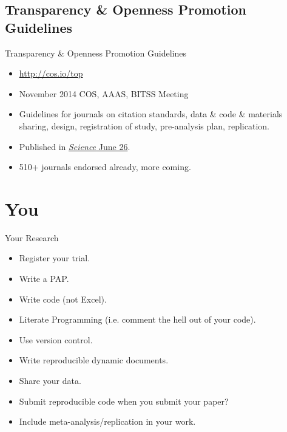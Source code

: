 \documentclass{beamer}
\begin{document}
\subsection{Transparency \& Openness Promotion Guidelines}
\begin{frame}{Transparency \& Openness Promotion Guidelines}
\begin{itemize}
\item \url{http://cos.io/top}
\item November 2014 COS, AAAS, BITSS Meeting

\item Guidelines for journals on citation standards, data \& code \& materials sharing, design, registration of study, pre-analysis plan, replication.

\item Published in \href{http://www.sciencemag.org/content/348/6242/1422.full}{\textit{Science} June 26}. 

\item 510+ journals endorsed already, more coming.
\end{itemize} 
\end{frame}
\section{You}
\begin{frame}{Your Research}
\begin{itemize}
\item Register your trial.
\item Write a PAP.
\item Write code (not Excel).
\item Literate Programming (i.e. comment the hell out of your code).
\item Use version control.
\item Write reproducible dynamic documents.
\item Share your data.
\item Submit reproducible code when you submit your paper?
\item Include meta-analysis/replication in your work.
\end{itemize}
\end{frame}
\end{document}
